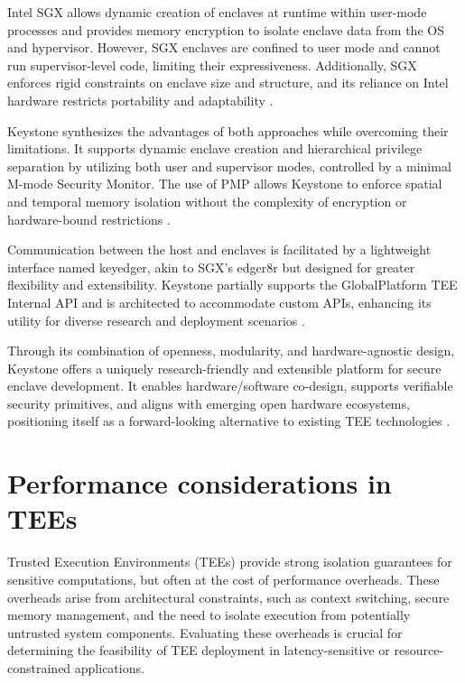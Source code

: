 Intel SGX allows dynamic creation of enclaves at runtime within user-mode processes and provides memory encryption to isolate enclave data from the OS and hypervisor. However, SGX enclaves are confined to user mode and cannot run supervisor-level code, limiting their expressiveness. Additionally, SGX enforces rigid constraints on enclave size and structure, and its reliance on Intel hardware restricts portability and adaptability \cite{dayeol2019keystone}.

Keystone synthesizes the advantages of both approaches while overcoming their limitations. It supports dynamic enclave creation and hierarchical privilege separation by utilizing both user and supervisor modes, controlled by a minimal M-mode Security Monitor. The use of PMP allows Keystone to enforce spatial and temporal memory isolation without the complexity of encryption or hardware-bound restrictions \cite{dayeol2019keystone}.

Communication between the host and enclaves is facilitated by a lightweight interface named keyedger, akin to SGX’s edger8r but designed for greater flexibility and extensibility. Keystone partially supports the GlobalPlatform TEE Internal API and is architected to accommodate custom APIs, enhancing its utility for diverse research and deployment scenarios \cite{dayeol2019keystone}.

Through its combination of openness, modularity, and hardware-agnostic design, Keystone offers a uniquely research-friendly and extensible platform for secure enclave development. It enables hardware/software co-design, supports verifiable security primitives, and aligns with emerging open hardware ecosystems, positioning itself as a forward-looking alternative to existing TEE technologies \cite{dayeol2019keystone}.

\section{Performance considerations in TEEs}

Trusted Execution Environments (TEEs) provide strong isolation guarantees for sensitive computations, but often at the cost of performance overheads. These overheads arise from architectural constraints, such as context switching, secure memory management, and the need to isolate execution from potentially untrusted system components. Evaluating these overheads is crucial for determining the feasibility of TEE deployment in latency-sensitive or resource-constrained applications.

